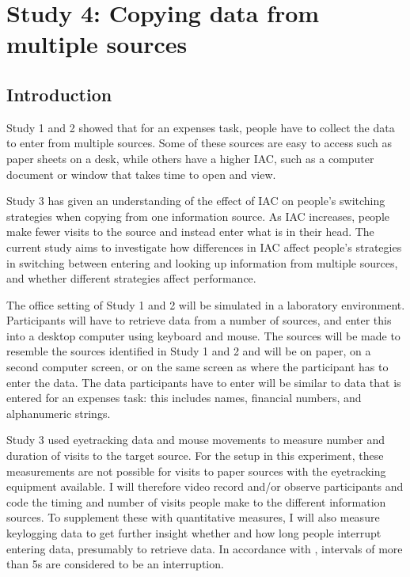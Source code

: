 \documentclass[11pt,oneside]{report}
\begin{document}
\begin{table}
\section{Study 4: Copying data from multiple sources}
 
\subsection{Introduction}
Study 1 and 2 showed that for an expenses task, people have to collect the data to enter from multiple sources. Some of these sources are easy to access such as paper sheets on a desk, while others have a higher IAC, such as a computer document or window that takes time to open and view.

Study 3 has given an understanding of the effect of IAC on people's switching strategies when copying from one information source. As IAC increases, people make fewer visits to the source and instead enter what is in their head. 
The current study aims to investigate how differences in IAC affect people's strategies in switching between entering and looking up information from multiple sources, and whether different strategies affect performance.

The office setting of Study 1 and 2 will be simulated in a laboratory environment. Participants will have to retrieve data from a number of sources, and enter this into a desktop computer using keyboard and mouse. The sources will be made to resemble the sources identified in Study 1 and 2 and will be on paper, on a second computer screen, or on the same screen as where the participant has to enter the data. The data participants have to enter will be similar to data that is entered for an expenses task: this includes names, financial numbers, and alphanumeric strings. 

Study 3 used eyetracking data and mouse movements to measure number and duration of visits to the target source. For the setup in this experiment, these measurements are not possible for visits to paper sources with the eyetracking equipment available.
I will therefore video record and/or observe participants and code the timing and number of visits people make to the different information sources.
To supplement these with quantitative measures, I will also measure keylogging data to get further insight whether and how long people interrupt entering data, presumably to retrieve data. In accordance with \citet{Gould2016}, intervals of more than 5s are considered to be an interruption. 


\end{table}
\end{document}
